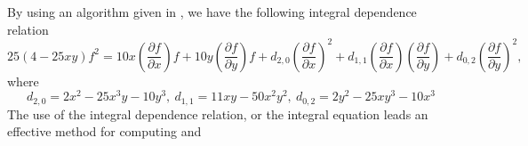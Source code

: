 \documentclass{arxsigma}
\begin{document}
\begin{remark*}
By using an algorithm given in \cite{NT20}, we have the following integral dependence relation
\begin{equation*}
25(4-25xy)f^2 = 10x\left(\frac{\partial f}{\partial x}\right)f+10y\left(\frac{\partial f}{\partial y}\right)f+d_{2,0}\left(\frac{\partial f}{\partial x}\right)^2+d_{1,1}\left(\frac{\partial f}{\partial x}\right)\left(\frac{\partial f}{\partial y}\right)+d_{0,2}\left(\frac{\partial f}{\partial y}\right)^2,
\end{equation*}
where
\begin{equation*}
d_{2,0}=2x^2-25x^3y-10y^3, \ d_{1,1}=11xy-50x^2y^2, \ d_{0,2}=2y^2-25xy^3-10x^3
\end{equation*}
The use of the integral dependence relation, or the integral equation leads an effective method for computing
  and  
\end{remark*}
\end{document}
